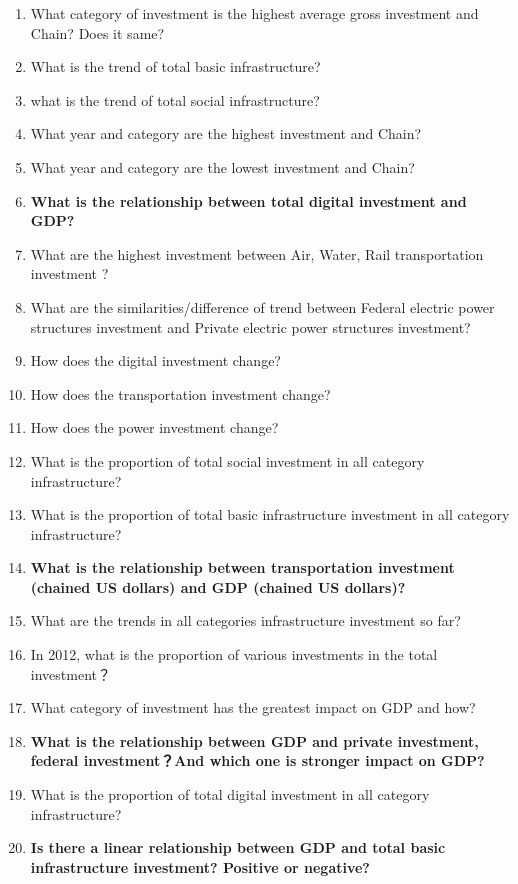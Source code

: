 \documentclass[
]{article}
\begin{document}
\begin{enumerate}
\def\labelenumi{\arabic{enumi}.}
\item
  What category of investment is the highest average gross investment and Chain? Does it same?
\item
  What is the trend of total basic infrastructure?
\item
  what is the trend of total social infrastructure?
\item
  What year and category are the highest investment and Chain?
\item
  What year and category are the lowest investment and Chain?
\item
  \textbf{What is the relationship between total digital investment and GDP?}
\item
  What are the highest investment between Air, Water, Rail transportation investment ?
\item
  What are the similarities/difference of trend between Federal electric power structures investment and Private electric power structures investment?
\item
  How does the digital investment change?
\item
  How does the transportation investment change?
\item
  How does the power investment change?
\item
  What is the proportion of total social investment in all category infrastructure?
\item
  What is the proportion of total basic infrastructure investment in all category infrastructure?
\item
  \textbf{What is the relationship between transportation investment (chained US dollars) and GDP (chained US dollars)?}
\item
  What are the trends in all categories infrastructure investment so far?
\item
  In 2012, what is the proportion of various investments in the total investment？
\item
  What category of investment has the greatest impact on GDP and how?
\item
  \textbf{What is the relationship between GDP and private investment, federal investment？And which one is stronger impact on GDP?}
\item
  What is the proportion of total digital investment in all category infrastructure?
\item
  \textbf{Is there a linear relationship between GDP and total basic infrastructure investment? Positive or negative?}
\end{enumerate}
\end{document}
